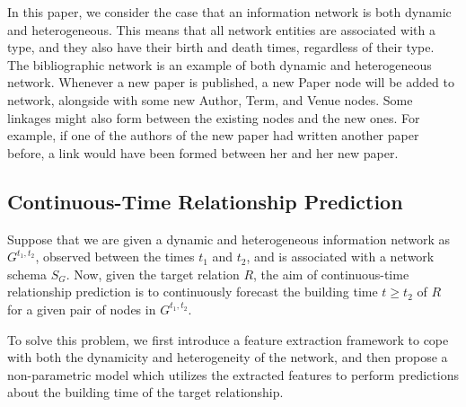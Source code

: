 In this paper, we consider the case that an information network is both dynamic and heterogeneous. This means that all network entities are associated with a type, and they also have their birth and death times, regardless of their type. The bibliographic network is an example of both dynamic and heterogeneous network. Whenever a new paper is published, a new Paper node will be added to network, alongside with some new Author, Term, and Venue nodes. Some linkages might also form between the existing nodes and the new ones. For example, if one of the authors of the new paper had written another paper before, a link would have been formed between her and her new paper.

\subsection{Continuous-Time Relationship Prediction}
Suppose that we are given a dynamic and heterogeneous information network as $G^{t_1,t_2}$, observed between the times $t_1$ and $t_2$, and is associated with a network schema $S_G$. Now, given the target relation $R$, the aim of continuous-time relationship prediction is to continuously forecast the building time $t\ge t_2$ of $R$ for a given pair of nodes in $G^{t_1,t_2}$.

To solve this problem, we first introduce a feature extraction framework to cope with both the dynamicity and heterogeneity of the network, and then propose a non-parametric model which utilizes the extracted features to perform predictions about the building time of the target relationship.
